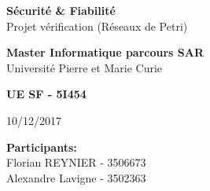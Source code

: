 \par
{}
\hfill
\par
\vspace{4\baselineskip}
\par
\begin{center}
    \textbf{\LARGE Sécurité \& Fiabilité}\\
    \Large Projet vérification (Réseaux de Petri)
\end{center}
\par
\vspace{4\baselineskip}
\begin{center}
    \textbf{Master Informatique parcours SAR}\\
    Université Pierre et Marie Curie
\end{center}
\par
\vspace{4\baselineskip}
\begin{center}
    \textbf{UE SF - 5I454}
\end{center}
\par
\vspace{4\baselineskip}

\begin{center}
    10/12/2017
\end{center}
\par
\vspace{4\baselineskip}
\par

\begin{minipage}{.35\textwidth}
    \textbf{Participants:}\\
    Florian REYNIER - 3506673\\
    Alexandre Lavigne - 3502363
\end{minipage}
\hfill
\par
\clearpage

